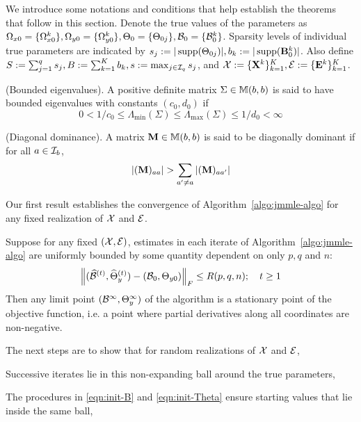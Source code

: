 We introduce some notations and conditions that help establish the theorems that follow in this section. Denote the true values of the parameters as $\Omega_{x 0} = \{ \Omega_{x 0}^k \}, \Omega_{y 0} = \{ \Omega_{y 0}^k \}, \Theta_0 = \{ \Theta_{0 j} \}, {\cal{B}}_0 = \{ {\cal{B}}_0^k \}$. Sparsity levels of individual true parameters are indicated by $s_j := | \operatorname*{supp} (\Theta_{0j})|, b_k := | \operatorname*{supp}({\mathbf{B}}^k_0) |$. Also define $S := \sum_{j=1}^q s_j, B:= \sum_{k=1}^K b_k, s:= \max_{j \in {\cal{I}}_q } s_j$, and ${\cal{X}} := \{ {\mathbf{X}}^k \}_{k=1}^K, {\cal{E}} := \{ {\mathbf{E}}^k \}_{k=1}^K$.

\vspace{1em}
 (Bounded eigenvalues). A positive definite matrix $\Sigma \in {\mathbb{M}}(b,b)$ is said to have bounded eigenvalues with constants $(c_0, d_0)$ if
%
\[
0 < 1/c_0 \leq \Lambda_{\min} (\Sigma) \leq \Lambda_{\max} (\Sigma) \leq 1/d_0 < \infty
\]

 (Diagonal dominance). A matrix ${\mathbf{M}}  \in {\mathbb{M}}(b,b)$ is said to be diagonally dominant if for all $a \in {\cal{I}}_b$,
%
$$
| ({\mathbf{M}})_{aa} | > \sum_{a' \neq a} |({\mathbf{M}})_{aa'} |
$$

Our first result establishes the convergence of Algorithm~\ref{algo:jmmle-algo} for any fixed realization of ${\cal{X}}$ and ${\cal{E}}$.

\begin{Theorem}
\label{thm:algo-convergence}
Suppose for any fixed $({\cal{X}}, {\cal{E}})$, estimates in each iterate of Algorithm~\ref{algo:jmmle-algo} are uniformly bounded by some quantity dependent on only $p, q$ and $n$:
%
\begin{align}
\left\| (\widehat {{\cal{B}}}^{(t)}, \widehat \Theta_y^{(t)}) - ( {\cal{B}}_0, \Theta_{y 0}) \right\|_F
\leq R(p,q,n);
\quad t \geq 1
\end{align}
%
Then any limit point $({\cal{B}}^\infty, \Theta_y^\infty)$ of the algorithm is a stationary point of the objective function, i.e. a point where partial derivatives along all coordinates are non-negative.
\end{Theorem}

The next steps are to show that for random realizations of ${\cal{X}}$ and ${\cal{E}}$,
%

\vspace{1em}
 Successive iterates lie in this non-expanding ball around the true parameters,

 The procedures in \eqref{eqn:init-B} and \eqref{eqn:init-Theta} ensure starting values that lie inside the same ball,
%

